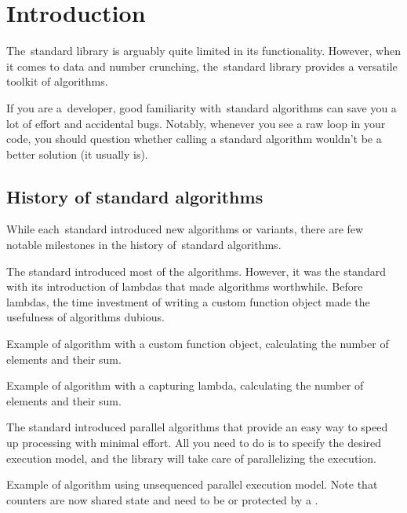 \chapter{Introduction}

The \CC\,standard library is arguably quite limited in its functionality. However, when it comes to data and number crunching, the \CC\,standard library provides a versatile toolkit of algorithms.

If you are a \CC\,developer, good familiarity with \CC\,standard algorithms can save you a lot of effort and accidental bugs. Notably, whenever you see a raw loop in your code, you should question whether calling a standard algorithm wouldn't be a better solution (it usually is).

\section{History of standard \texorpdfstring{\CC}{C++} algorithms}

While each \CC\,standard introduced new algorithms or variants, there are few notable milestones in the history of \CC\,standard algorithms.

The  standard introduced most of the algorithms. However, it was the  standard with its introduction of lambdas that made algorithms worthwhile. Before lambdas, the time investment of writing a custom function object made the usefulness of algorithms dubious.

\begin{box-note}
\footnotesize Example of  algorithm with a custom function object, calculating the number of elements and their sum.
\tcblower
{}
\end{box-note}

\begin{box-note}
\footnotesize Example of  algorithm with a capturing lambda, calculating the number of elements and their sum.
\tcblower
{}
\end{box-note}

The  standard introduced parallel algorithms that provide an easy way to speed up processing with minimal effort. All you need to do is to specify the desired execution model, and the library will take care of parallelizing the execution.

\begin{box-note}
\footnotesize Example of  algorithm using unsequenced parallel execution model. Note that counters are now shared state and need to be  or protected by a .
\tcblower
{}
\end{box-note}

